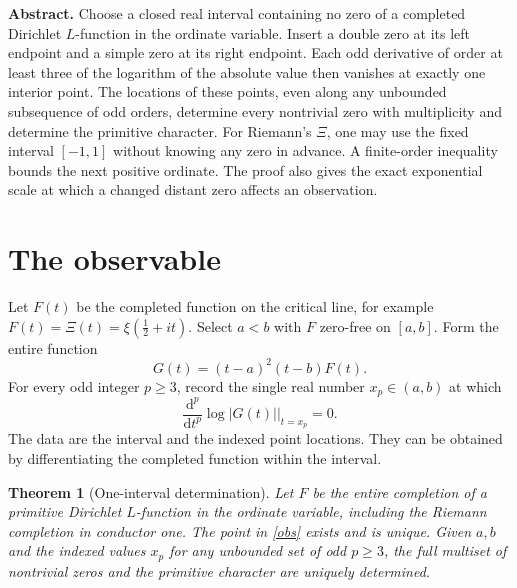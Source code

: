 \documentclass[11pt,letterpaper]{article}
\newtheorem{theorem}{Theorem}
\newcommand{\dd}{\mathrm d}
\numberwithin{equation}{section}
\begin{document}
\thispagestyle{plain}
\bigskip

\medskip
{}
\bigskip

\noindent\textbf{Abstract.}
Choose a closed real interval containing no zero of a completed Dirichlet
$L$-function in the ordinate variable. Insert a double zero at its left
endpoint and a simple zero at its right endpoint. Each odd derivative of
order at least three of the logarithm of the absolute value then vanishes
at exactly one interior point. The locations of these points, even along
any unbounded subsequence of odd orders, determine every nontrivial zero
with multiplicity and determine the primitive character. For Riemann's
$\Xi$, one may use the fixed interval $[-1,1]$ without knowing any zero
in advance. A finite-order inequality bounds the next positive ordinate.
The proof also gives the exact exponential scale at which a changed
distant zero affects an observation.

\section{The observable}
Let $F(t)$ be the completed function on the critical line, for example
$F(t)=\Xi(t)=\xi(\tfrac12+it)$. Select $a<b$ with $F$ zero-free on
$[a,b]$. Form the entire function
\[
       G(t)=(t-a)^2(t-b)F(t).
\]
For every odd integer $p\ge3$, record the single real number $x_p\in(a,b)$
at which
\begin{equation}\label{obs}
       \frac{\dd^p}{\dd t^p}\log|G(t)|\bigg|_{t=x_p}=0.
\end{equation}
The data are the interval and the indexed point locations. They can be
obtained by differentiating the completed function within the interval.

\begin{theorem}[One-interval determination]\label{main}
Let $F$ be the entire completion of a primitive Dirichlet $L$-function in
the ordinate variable, including the Riemann completion in conductor one.
The point in \eqref{obs} exists and is unique. Given $a,b$ and the indexed
values $x_p$ for any unbounded set of odd $p\ge3$, the full multiset of
nontrivial zeros and the primitive character are uniquely determined.
\end{theorem}
\end{document}
